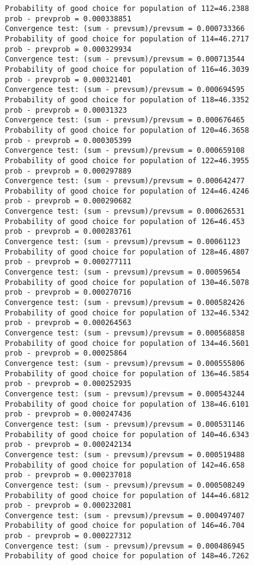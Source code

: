 \documentclass[11pt,onecolumn]{article}
\begin{document}
\begin{verbatim}
Probability of good choice for population of 112=46.2388
prob - prevprob = 0.000338851
Convergence test: (sum - prevsum)/prevsum = 0.000733366
Probability of good choice for population of 114=46.2717
prob - prevprob = 0.000329934
Convergence test: (sum - prevsum)/prevsum = 0.000713544
Probability of good choice for population of 116=46.3039
prob - prevprob = 0.000321401
Convergence test: (sum - prevsum)/prevsum = 0.000694595
Probability of good choice for population of 118=46.3352
prob - prevprob = 0.00031323
Convergence test: (sum - prevsum)/prevsum = 0.000676465
Probability of good choice for population of 120=46.3658
prob - prevprob = 0.000305399
Convergence test: (sum - prevsum)/prevsum = 0.000659108
Probability of good choice for population of 122=46.3955
prob - prevprob = 0.000297889
Convergence test: (sum - prevsum)/prevsum = 0.000642477
Probability of good choice for population of 124=46.4246
prob - prevprob = 0.000290682
Convergence test: (sum - prevsum)/prevsum = 0.000626531
Probability of good choice for population of 126=46.453
prob - prevprob = 0.000283761
Convergence test: (sum - prevsum)/prevsum = 0.00061123
Probability of good choice for population of 128=46.4807
prob - prevprob = 0.000277111
Convergence test: (sum - prevsum)/prevsum = 0.00059654
Probability of good choice for population of 130=46.5078
prob - prevprob = 0.000270716
Convergence test: (sum - prevsum)/prevsum = 0.000582426
Probability of good choice for population of 132=46.5342
prob - prevprob = 0.000264563
Convergence test: (sum - prevsum)/prevsum = 0.000568858
Probability of good choice for population of 134=46.5601
prob - prevprob = 0.00025864
Convergence test: (sum - prevsum)/prevsum = 0.000555806
Probability of good choice for population of 136=46.5854
prob - prevprob = 0.000252935
Convergence test: (sum - prevsum)/prevsum = 0.000543244
Probability of good choice for population of 138=46.6101
prob - prevprob = 0.000247436
Convergence test: (sum - prevsum)/prevsum = 0.000531146
Probability of good choice for population of 140=46.6343
prob - prevprob = 0.000242134
Convergence test: (sum - prevsum)/prevsum = 0.000519488
Probability of good choice for population of 142=46.658
prob - prevprob = 0.000237018
Convergence test: (sum - prevsum)/prevsum = 0.000508249
Probability of good choice for population of 144=46.6812
prob - prevprob = 0.000232081
Convergence test: (sum - prevsum)/prevsum = 0.000497407
Probability of good choice for population of 146=46.704
prob - prevprob = 0.000227312
Convergence test: (sum - prevsum)/prevsum = 0.000486945
Probability of good choice for population of 148=46.7262

\end{verbatim}
\end{document}
